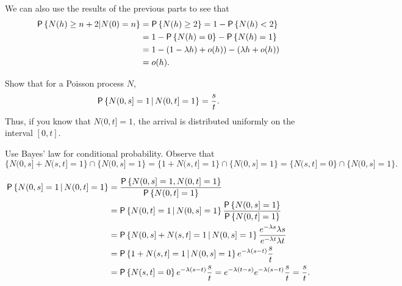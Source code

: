 \begin{question}
\begin{solution}
\begin{enumerate}
We can also use the results of the previous parts to see that
\begin{equation*}
    \begin{split}
  \P{N(h) \geq n+2 | N(0) = n} 
&= \P{N(h) \geq 2} = 1- \P{N(h)<2} \\
&= 1 - \P{N(h)= 0} - \P{N(h)=1} \\
&= 1 - (1-\lambda h) + o(h) ) - (\lambda h + o(h)) \\
&= o(h).
\end{split}  
\end{equation*}
\end{enumerate}
\end{solution}
\end{question}


\begin{question}
Show that  for a Poisson process $N$, 
\begin{equation*}
  \P{N(0,s] =1\given N(0,t]=1} = \frac st.
\end{equation*}
Thus, if you know that $N(0,t]=1$, the arrival is distributed
uniformly on the interval $[0,t]$.


\begin{hint}
Use Bayes' law for conditional probability. Observe that 
  \begin{equation*}
\{N(0,s]+N(s,t]=1\}\cap\{N(0,s]=1\} = \{1+N(s,t]=1\}\cap\{N(0,s]=1\}=\{N(s,t]=0\}\cap\{N(0,s]=1\}.
  \end{equation*}
\end{hint}

\begin{solution}
\begin{equation*}
  \begin{split}
  \P{N(0,s] =1\given N(0,t]=1} 
&= \frac{\P{N(0,s] =1, N(0,t]=1}}{\P{N(0,t]=1}} \\
&=   \P{N(0,t] =1\given N(0,s]=1} \frac{\P{N(0,s] =1}}{\P{N(0,t]=1}} \\
&=   \P{N(0,s] + N(s,t] =1\given N(0,s]=1} \frac{e^{-\lambda s}\lambda s}{e^{-\lambda t} \lambda t} \\
&=   \P{1 + N(s,t] =1\given N(0,s]=1} e^{-\lambda (s-t)} \frac{s}{t} \\
&=   \P{N(s,t] =0} e^{-\lambda (s-t)} \frac{s}{t} = e^{-\lambda(t-s)} e^{-\lambda (s-t)} \frac{s}{t} = \frac st.
  \end{split}
\end{equation*}
\end{solution}
\end{question}

